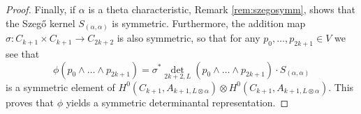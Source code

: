 \documentclass[10pt,a4paper]{amsart}
\begin{document}
\begin{proof}
	\noindent
	Finally, if $\alpha$ is a theta characteristic, Remark \ref{rem:szegosymm}, shows that the Szeg\H{o} kernel $S_{(\alpha,\alpha)}$ is symmetric. Furthermore, the addition map $\sigma\colon C_{k+1}\times C_{k+1} \to C_{2k+2}$ is also symmetric, so that for any $p_0,\dots,p_{2k+1}\in V$ we see that \[ \phi(p_0\wedge \dots \wedge p_{2k+1}) = \sigma^*\det_{2k+2,L}\left( p_0 \wedge \dots \wedge p_{2k+1}  \right)\cdot S_{(\alpha,\alpha)} \]  is a symmetric element of $H^0(C_{k+1},A_{k+1,L\otimes \alpha}) \otimes H^0(C_{k+1},A_{k+1,L\otimes \alpha})$. This proves that $\phi$ yields a symmetric determinantal representation.
\end{proof}
\end{document}
